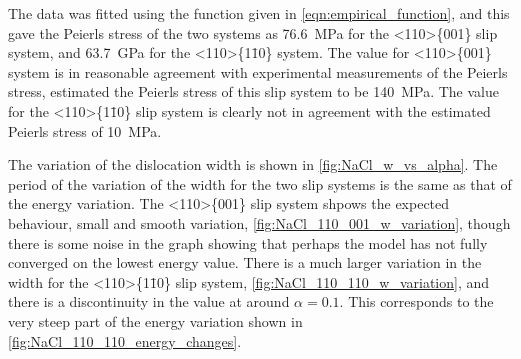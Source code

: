 


The data was fitted using the function given in \autoref{eqn:empirical_function}, and this gave the Peierls stress of the two systems as \SI{76.6}{\mega\pascal} for the <110>\{001\} slip system, and \SI{63.7}{\giga\pascal} for the <110>\{1\={1}0\} system. The value for <110>\{001\} system is in reasonable agreement with experimental measurements of the Peierls stress, \citet{Haasen1985} estimated the Peierls stress of this slip system to be \SI{140}{\mega\pascal}. The value for the <110>\{1\={1}0\} slip system is clearly not in agreement with the estimated Peierls stress of \SI{10}{\mega\pascal}.



The variation of the dislocation width is shown in \autoref{fig:NaCl_w_vs_alpha}. The period of the variation of the width for the two slip systems is the same as that of the energy variation. The <110>\{001\} slip system shpows the expected behaviour, small and smooth variation, \autoref{fig:NaCl_110_001_w_variation}, though there is some noise in the graph showing that perhaps the model has not fully converged on the lowest energy value. There is a much larger variation in the width for the <110>\{1\={1}0\} slip system, \ref{fig:NaCl_110_110_w_variation}, and there is a discontinuity in the value at around $\alpha=0.1$. This corresponds to the very steep part of the energy variation shown in \autoref{fig:NaCl_110_110_energy_changes}.


